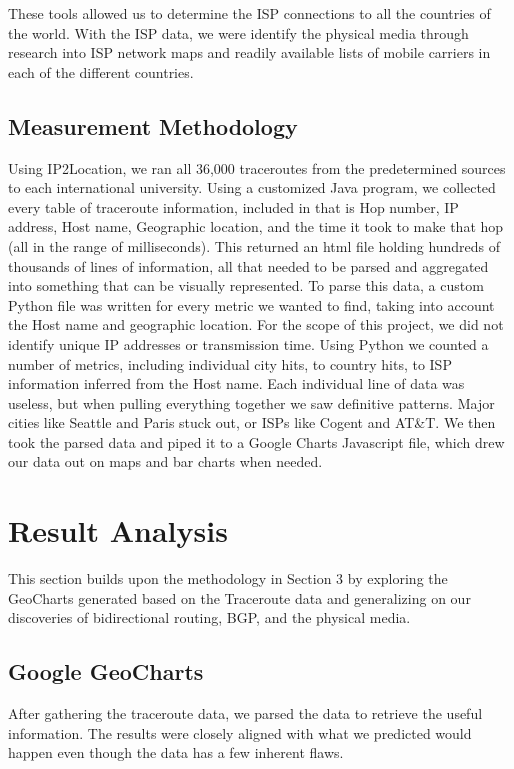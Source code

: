 \documentclass{sigcomm-alternate}
\begin{document}
These tools allowed us to determine the ISP connections to all the countries of the world. With the ISP data, we were identify the physical media through research into ISP network maps and readily available lists of mobile carriers in each of the different countries.
 

\subsection{Measurement Methodology}
Using IP2Location, we ran all 36,000 traceroutes from the predetermined sources to each international university. Using a customized Java program, we collected every table of traceroute information, included in that is Hop number, IP address, Host name, Geographic location, and the time it took to make that hop (all in the range of milliseconds).  This returned an html file holding hundreds of thousands of lines of information, all that needed to be parsed and aggregated into something that can be visually represented. To parse this data, a custom Python file was written for every metric we wanted to find, taking into account the Host name and geographic location. For the scope of this project, we did not identify unique IP addresses or transmission time. Using Python we counted a number of metrics, including individual city hits, to country hits, to ISP information inferred from the Host name. Each individual line of data was useless, but when pulling everything together we saw definitive patterns. Major cities like Seattle and Paris stuck out, or ISPs like Cogent and AT&T. We then took the parsed data and piped it to a Google Charts Javascript file, which drew our data out on maps and bar charts when needed.


\section{Result Analysis}
This section builds upon the methodology in Section 3 by exploring the GeoCharts generated based on the Traceroute data and generalizing on our discoveries of bidirectional routing, BGP, and the physical media.

\subsection{Google GeoCharts}
After gathering the traceroute data, we parsed the data to retrieve the useful information. The results were closely aligned with what we predicted would happen even though the data has a few inherent flaws.
 
\end{document}

